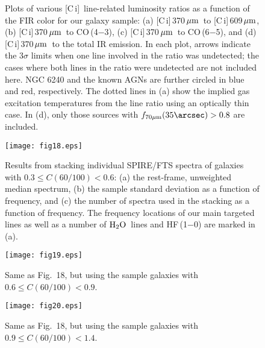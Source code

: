 \documentclass[preprint]{aastex}
\newcommand{\um}{\mbox{$\,\mu{\rm m}$}}
\newcommand{\Water}{\mbox{${\rm H}_2{\rm O}$}}
\newcommand{\CI}{[C\,{\sc i}]}
\begin{document}
\begin{figure}
\centering
{}
\caption{
Plots of various \CI\ line-related luminosity ratios as a function of the FIR 
color for our galaxy sample:
(a) \CI\,370\um\ to \CI\,609\um, (b) \CI\,370\um\ to CO\,(4$-$3), 
(c) \CI\,370\um\ to CO\,(6$-$5), and (d) \CI\,370\um\ to the total
IR emission.
In each plot, arrows indicate the 3$\sigma$ limits when one line involved
in the ratio was undetected; the cases where both lines in the ratio were 
undetected are not included here.  NGC 6240 and the known AGNs are further
circled in blue and red, respectively.  
The dotted lines in (a) show the implied gas excitation temperatures
from the line ratio using an optically thin case.
In (d), only those sources with $f_{70\mu{\rm m}}(35\arcsec) > 0.8$ are included.
}
\label{Fig17}
\end{figure}
\clearpage





\begin{figure}
\centering
\texttt{[image: fig18.eps]}
\caption{
Results from stacking individual SPIRE/FTS spectra of galaxies with $0.3 \leqslant 
C(60/100) < 0.6$: (a) the rest-frame, unweighted median spectrum, 
(b) the sample standard deviation as a function of frequency, and (c) the number 
of spectra used in the stacking as a function of frequency.  The frequency 
locations of our main targeted lines as well as a number of \Water\ lines and
HF\,(1$-$0) are marked in (a).
}
\label{Fig18}
\end{figure}
\clearpage



\begin{figure}
\centering
\texttt{[image: fig19.eps]}
\caption{
Same as Fig.~18, but using the sample galaxies with $0.6 \leqslant C(60/100) < 0.9$.
}
\label{Fig19}
\end{figure}
\clearpage



\begin{figure}
\centering
\texttt{[image: fig20.eps]}
\caption{
Same as Fig.~18, but using the sample galaxies with $0.9 \leqslant C(60/100) < 1.4$.
}
\label{Fig19}
\end{figure}
\clearpage
\end{document}
